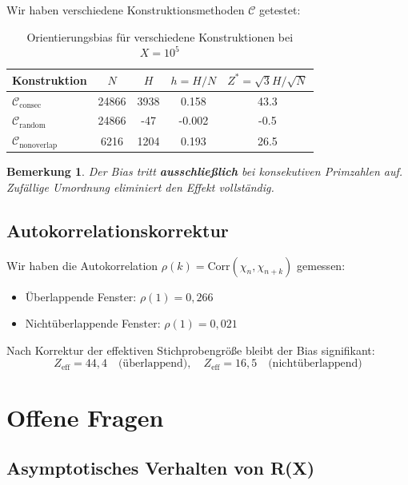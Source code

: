 \documentclass[11pt,a4paper]{article}
\newtheorem{remark}[theorem]{Bemerkung}
\begin{document}
Wir haben verschiedene Konstruktionsmethoden $\mathcal{C}$ getestet:

\begin{table}[h]
\centering
\caption{Orientierungsbias für verschiedene Konstruktionen bei $X = 10^5$}
\label{tab:constructions}
\begin{tabular}{@{}lcccc@{}}
\toprule
Konstruktion & $N$ & $H$ & $h = H/N$ & $Z^* = \sqrt{3} H / \sqrt{N}$ \\ \midrule
$\mathcal{C}_{\text{consec}}$ & 24866 & 3938 & 0.158 & 43.3 \\
$\mathcal{C}_{\text{random}}$ & 24866 & -47 & -0.002 & -0.5 \\
$\mathcal{C}_{\text{nonoverlap}}$ & 6216 & 1204 & 0.193 & 26.5 \\ \bottomrule
\end{tabular}
\end{table}

\begin{remark}
Der Bias tritt \textbf{ausschließlich} bei konsekutiven Primzahlen auf. Zufällige Umordnung eliminiert den Effekt vollständig.
\end{remark}

\subsection{Autokorrelationskorrektur}

Wir haben die Autokorrelation $\rho(k) = \text{Corr}(\chi_n, \chi_{n+k})$ gemessen:

\begin{itemize}
\item Überlappende Fenster: $\rho(1) = 0{,}266$
\item Nichtüberlappende Fenster: $\rho(1) = 0{,}021$
\end{itemize}

Nach Korrektur der effektiven Stichprobengröße bleibt der Bias signifikant:
\[
Z_{\text{eff}} = 44{,}4 \quad \text{(überlappend)}, \quad Z_{\text{eff}} = 16{,}5 \quad \text{(nichtüberlappend)}
\]

\section{Offene Fragen}

\subsection{Asymptotisches Verhalten von R(X)}
\end{document}
